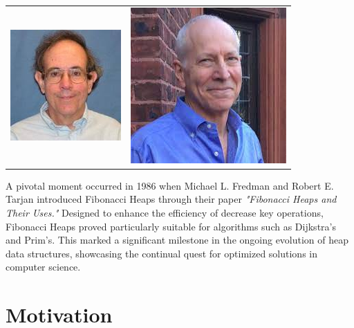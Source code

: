 \documentclass[12pt, a4paper]{article}
\begin{document}
	\begin{table}[h]
		\centering
		\begin{tabular}{c c}
			\includegraphics[scale=0.7]{History/Michael.jpg} & \includegraphics[scale=0.5]{History/Tarjan.jpg} \\
		\end{tabular}
	\end{table}
	
	
	A pivotal moment occurred in 1986 when Michael L. Fredman and Robert E. Tarjan introduced Fibonacci Heaps through their paper \textit{"Fibonacci Heaps and Their Uses."} Designed to enhance the efficiency of decrease key operations, Fibonacci Heaps proved particularly suitable for algorithms such as Dijkstra's and Prim's. This marked a significant milestone in the ongoing evolution of heap data structures, showcasing the continual quest for optimized solutions in computer science.
	
	
	\section{Motivation}
	
	
\end{document}
